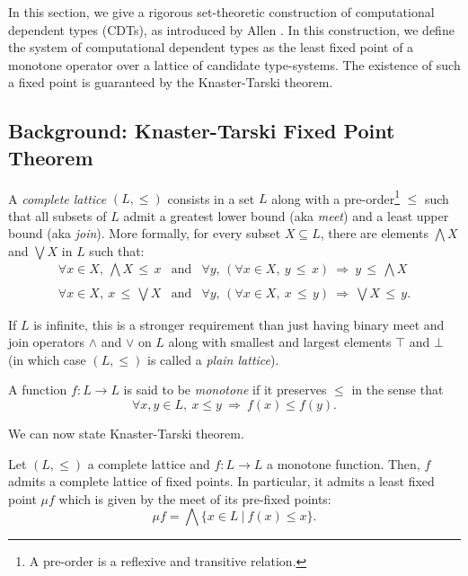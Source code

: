\documentclass{article} \usepackage{chtt-notes} \usepackage{stmaryrd}
\newcommand{\meet}[1]{\bigwedge\!#1}
\newcommand{\join}[1]{\bigvee\!#1}
\begin{document}
In this section, we give a rigorous set-theoretic construction of
computational dependent types (CDTs), as introduced by Allen
\cite{Allen:87}. In this construction, we define the system of
computational dependent types as the least fixed point of a monotone
operator over a lattice of candidate type-systems. The existence of
such a fixed point is guaranteed by the Knaster-Tarski theorem.

\subsection{Background: Knaster-Tarski Fixed Point Theorem}

A \emph{complete lattice} $(L, \leq)$ consists in a set $L$ along with
a pre-order\footnote{A pre-order is a reflexive and transitive
  relation.} $\leq$ such that all subsets of $L$ admit a greatest
lower bound (aka \emph{meet}) and a least upper bound (aka
\emph{join}).  More formally, for every subset $X \subseteq L$, there
are elements $\meet{X}$ and $\join{X}$ in $L$ such that:
\[\begin{array}{ccc}
    \forall x\in X, \ \meet{X} \,\leq\, x  &  \text{and}  &
    \forall y,\, \left( \forall x\in X, \ y \,\leq\, x  \right) \ \Longrightarrow \ 
    y \,\leq\, \meet{X} \\ \\
    \forall x\in X, \ x \,\leq\, \join{X}  & \text{and}  &
    \forall y,\, \left( \forall x\in X, \ x \,\leq\, y  \right) \ \Longrightarrow \ 
    \join{X} \,\leq\, y.
  \end{array}\]
\begin{remark*}
  If $L$ is infinite, this is a stronger requirement than just having
  binary meet and join operators $\wedge$ and $\vee$ on $L$ along with
  smallest and largest elements $\top$ and $\bot$ (in which case
  $(L, \leq)$ is called a \emph{plain lattice}).
\end{remark*}
A function $f : L \to L$ is said to be \emph{monotone} if it preserves
$\leq$ in the sense that
\[ \forall x, y \in L, \ x \leq y \ \Longrightarrow \ f(x) \leq
  f(y).\]

We can now state Knaster-Tarski theorem.

\begin{theorem*}
  Let $(L, \leq)$ a complete lattice and $f : L \to L$ a monotone
  function.  Then, $f$ admits a complete lattice of fixed points. In
  particular, it admits a least fixed point $\mu f$ which is given by
  the meet of its pre-fixed points:
  \[ \mu f = \bigwedge \{ x \in L \ |\ f(x) \leq x\}.\]
\end{theorem*}
\end{document}
